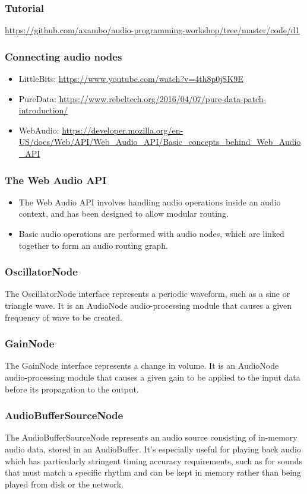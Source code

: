 \documentclass[screen, aspectratio=43]{beamer}
\begin{document}
\begin{frame}
\frametitle{Tutorial}
\url{https://github.com/axambo/audio-programming-workshop/tree/master/code/d1}
\end{frame}

\begin{frame}
\frametitle{Connecting audio nodes}
\begin{itemize}
\item LittleBits: \url{https://www.youtube.com/watch?v=4th8p0jSK9E}
\item PureData: \url{https://www.rebeltech.org/2016/04/07/pure-data-patch-introduction/}
\item WebAudio: \url{https://developer.mozilla.org/en-US/docs/Web/API/Web_Audio_API/Basic_concepts_behind_Web_Audio_API}
\end{itemize}
\end{frame}

\begin{frame}
\frametitle{The Web Audio API}
\begin{itemize}
\item The Web Audio API involves handling audio operations inside an audio context, and has been designed to allow modular routing.
\item Basic audio operations are performed with audio nodes, which are linked together to form an audio routing graph.
\end{itemize}
\end{frame}

\begin{frame}
\frametitle{OscillatorNode}
The OscillatorNode interface represents a periodic waveform, such as a sine or triangle wave. It is an AudioNode audio-processing module that causes a given frequency of wave to be created.
\end{frame}

\begin{frame}
\frametitle{GainNode}
The GainNode interface represents a change in volume. It is an AudioNode audio-processing module that causes a given gain to be applied to the input data before its propagation to the output.
\end{frame}

\begin{frame}
\frametitle{AudioBufferSourceNode}
The AudioBufferSourceNode represents an audio source consisting of in-memory audio data, stored in an AudioBuffer. It's especially useful for playing back audio which has particularly stringent timing accuracy requirements, such as for sounds that must match a specific rhythm and can be kept in memory rather than being played from disk or the network. 
\end{frame}
\end{document}
